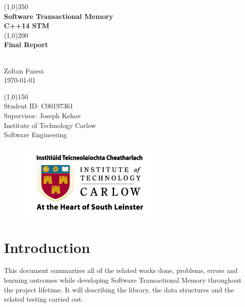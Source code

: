 \documentclass[12pt]{article}
\begin{document}
\begin{titlepage}
	\begin{center}
	\line(1,0){350}\\
	[0.3 cm]
	\huge{\textbf{Software Transactional Memory\\[0.3 cm]C++14 STM\\ }} 
	\line(1,0){200}\\
	[0.3 cm]
	\huge{\textbf{Final Report }} 
		\begin{LARGE}
		\\[0.3 cm]Zoltan Fuzesi\\
		\today
		\end{LARGE}
		
		\begin{LARGE}
		\line(1,0){150}\\
		[1.0 cm]
		Student ID: C00197361\\
		Supervisor: Joseph Kehoe\\
		\color{gray}Institute of Technology Carlow\\
		\color{gray}Software Engineering
		\end{LARGE}
		
\begin{figure}[h!]
\centering
\includegraphics[scale=0.7]{Pictures/carlow.png}

\end{figure}
		
	\end{center}
\end{titlepage}

\tableofcontents


\clearpage
{}
\setcounter{page}{1}
\section{Introduction}
This document summarizes all of the related works done, problems, errors and learning outcomes while developing Software Transactional Memory throughout the project lifetime. It will describing the library, the data structures and the related testing carried out.   
\end{document}
